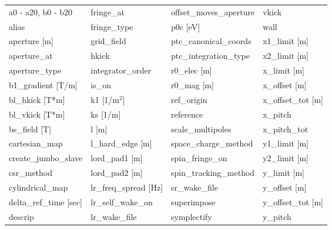  \begin{tabular}{llll} \toprule
a0 - a20, b0 - b20             & fringe_at                      & offset_moves_aperture          & vkick                          \\
alias                          & fringe_type                    & p0c [eV]                       & wall                           \\
aperture [m]                   & grid_field                     & ptc_canonical_coords           & x1_limit [m]                   \\
aperture_at                    & hkick                          & ptc_integration_type           & x2_limit [m]                   \\
aperture_type                  & integrator_order               & r0_elec [m]                    & x_limit [m]                    \\
b1_gradient [T/m]              & is_on                          & r0_mag [m]                     & x_offset [m]                   \\
bl_hkick [T*m]                 & k1 [1/m$^2$]                   & ref_origin                     & x_offset_tot [m]               \\
bl_vkick [T*m]                 & ks [1/m]                       & reference                      & x_pitch                        \\
bs_field [T]                   & l [m]                          & scale_multipoles               & x_pitch_tot                    \\
cartesian_map                  & l_hard_edge [m]                & space_charge_method            & y1_limit [m]                   \\
create_jumbo_slave             & lord_pad1 [m]                  & spin_fringe_on                 & y2_limit [m]                   \\
csr_method                     & lord_pad2 [m]                  & spin_tracking_method           & y_limit [m]                    \\
cylindrical_map                & lr_freq_spread [Hz]            & sr_wake_file                   & y_offset [m]                   \\
delta_ref_time [sec]           & lr_self_wake_on                & superimpose                    & y_offset_tot [m]               \\
descrip                        & lr_wake_file                   & symplectify                    & y_pitch                        \\

\end{tabular}
